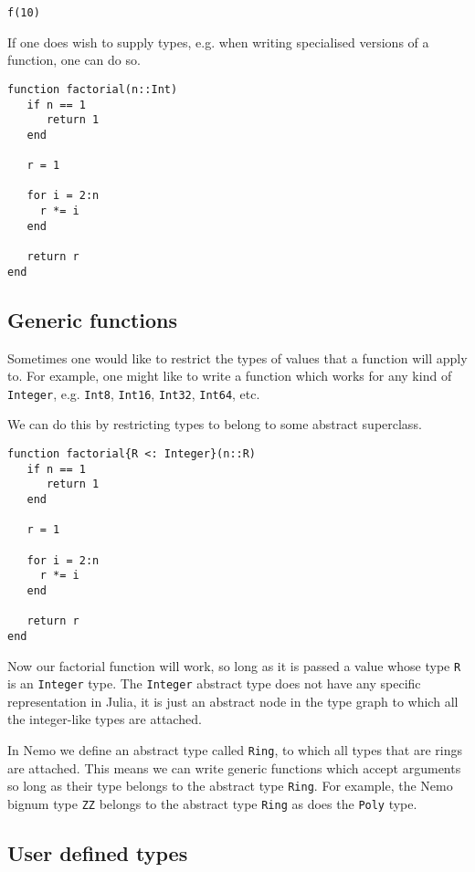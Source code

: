 \documentclass[a4paper,10pt]{article}
\newcommand{\code}{\lstinline}
\begin{document}
{{{{\begin{lstlisting}
f(10)
\end{lstlisting}

If one does wish to supply types, e.g. when writing specialised versions of a function, one
can do so.

\begin{lstlisting}
function factorial(n::Int)
   if n == 1
      return 1
   end

   r = 1
   
   for i = 2:n
     r *= i
   end

   return r  
end
\end{lstlisting}

\subsection{Generic functions}

Sometimes one would like to restrict the types of values that a function will apply to. For
example, one might like to write a function which works for any kind of \code{Integer}, e.g.
\code{Int8}, \code{Int16}, \code{Int32}, \code{Int64}, etc.

We can do this by  restricting types to belong to some abstract superclass.

\begin{lstlisting}
function factorial{R <: Integer}(n::R)
   if n == 1
      return 1
   end

   r = 1
   
   for i = 2:n
     r *= i
   end

   return r  
end
\end{lstlisting}

Now our factorial function will work, so long as it is passed a value whose type \code{R} is
an \code{Integer} type. The \code{Integer} abstract type does not have any specific
representation in Julia, it is just an abstract node in the type graph to which all the
integer-like types are attached.

In Nemo we define an abstract type called \code{Ring}, to which all types that are rings
are attached. This means we can write generic functions which accept arguments so long as
their type belongs to the abstract type \code{Ring}. For example, the Nemo bignum type
\code{ZZ} belongs to the abstract type \code{Ring} as does the \code{Poly} type.

\subsection{User defined types}

}}}}
\end{document}

